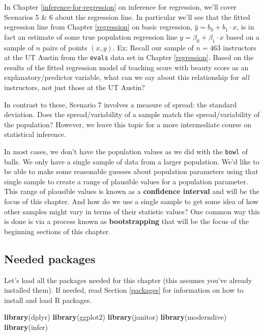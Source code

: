 \documentclass[12pt, krantz2,]{krantz}
\makeatletter
\newenvironment{Shaded}{\begin{snugshade}}{\end{snugshade}}
\newcommand{\KeywordTok}[1]{\textcolor[rgb]{0.27,0.27,0.27}{\textbf{#1}}}
\newcommand{\NormalTok}[1]{#1}
\newenvironment{kframe}{%
\medskip{}
\setlength{\fboxsep}{.8em}
 \def\at@end@of@kframe{}%
 \ifinner\ifhmode%
  \def\at@end@of@kframe{\end{minipage}}%
  \begin{minipage}{\columnwidth}%
 \fi\fi%
 \def\FrameCommand##1{\hskip\@totalleftmargin \hskip-\fboxsep
 \colorbox{shadecolor}{##1}\hskip-\fboxsep
     \hskip-\linewidth \hskip-\@totalleftmargin \hskip\columnwidth}%
 \MakeFramed {\advance\hsize-\width
   \@totalleftmargin\z@ \linewidth\hsize
   \@setminipage}}%
 {\par\unskip\endMakeFramed%
 \at@end@of@kframe}
\renewenvironment{Shaded}{\begin{kframe}}{\end{kframe}}
\makeatother
\begin{document}
In Chapter \ref{inference-for-regression} on inference for regression, we'll cover Scenarios 5 \& 6 about the regression line. In particular we'll see that the fitted regression line from Chapter \ref{regression} on basic regression, \(\widehat{y} = b_0 + b_1 \cdot x\), is in fact an estimate of some true population regression line \(y = \beta_0 + \beta_1 \cdot x\) based on a sample of \(n\) pairs of points \((x, y)\). Ex: Recall our sample of \(n=463\) instructors at the UT Austin from the \texttt{evals} data set in Chapter \ref{regression}. Based on the results of the fitted regression model of teaching score with beauty score as an explanatory/predictor variable, what can we say about this relationship for \emph{all} instructors, not just those at the UT Austin?

In contrast to these, Scenario 7 involves a measure of spread: the standard deviation. Does the spread/variability of a sample match the spread/variability of the population? However, we leave this topic for a more intermediate course on statistical inference.

In most cases, we don't have the population values as we did with the \texttt{bowl} of balls. We only have a single sample of data from a larger population. We'd like to be able to make some reasonable guesses about population parameters using that single sample to create a range of plausible values for a population parameter. This range of plausible values is known as a \textbf{confidence interval} and will be the focus of this chapter. And how do we use a single sample to get some idea of how other samples might vary in terms of their statistic values? One common way this is done is via a process known as \textbf{bootstrapping} that will be the focus of the beginning sections of this chapter.

\hypertarget{needed-packages-6}{%
\subsection*{Needed packages}\label{needed-packages-6}}


Let's load all the packages needed for this chapter (this assumes you've already installed them). If needed, read Section \ref{packages} for information on how to install and load R packages.

\begin{Shaded}
\begin{Highlighting}[]
\KeywordTok{library}\NormalTok{(dplyr)}
\KeywordTok{library}\NormalTok{(ggplot2)}
\KeywordTok{library}\NormalTok{(janitor)}
\KeywordTok{library}\NormalTok{(moderndive)}
\KeywordTok{library}\NormalTok{(infer)}
\end{Highlighting}
\end{Shaded}
\end{document}
